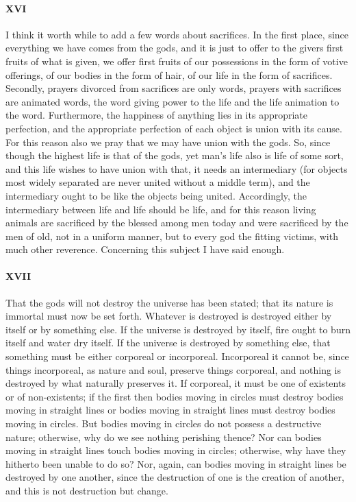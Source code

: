 \documentclass[12pt]{article}
\begin{document}
\paragraph{XVI} I think it worth while to add a few words about sacrifices.  In
the first place, since everything we have comes from the gods, and it is just
to offer to the givers first fruits of what is given, we offer first fruits of
our possessions in the form of votive offerings, of our bodies in the form of
hair, of our life in the form of sacrifices. Secondly, prayers divorced from
sacrifices are only words, prayers with sacrifices are animated words, the word
giving power to the life and the life animation to the word. Furthermore, the
happiness of anything lies in its appropriate perfection, and the appropriate
perfection of each object is union with its cause. For this reason also we pray
that we may have union with the gods. So, since though the highest life is that
of the gods, yet man's life also is life of some sort, and this life wishes to
have union with that, it needs an intermediary (for objects most widely
separated are never united without a middle term), and the intermediary ought
to be like the objects being united. Accordingly, the intermediary between life
and life should be life, and for this reason living animals are sacrificed by
the blessed among men today and were sacrificed by the men of old, not in a
uniform manner, but to every god the fitting victims, with much other
reverence. Concerning this subject I have said enough.

\paragraph{XVII} That the gods will not destroy the universe has been stated;
that its nature is immortal must now be set forth. Whatever is destroyed is
destroyed either by itself or by something else. If the universe is destroyed
by itself, fire ought to burn itself and water dry itself. If the universe is
destroyed by something else, that something must be either corporeal or
incorporeal. Incorporeal it cannot be, since things incorporeal, as nature and
soul, preserve things corporeal, and nothing is destroyed by what naturally
preserves it. If corporeal, it must be one of existents or of non-existents; if
the first then bodies moving in circles must destroy bodies moving in straight
lines or bodies moving in straight lines must destroy bodies moving in circles.
But bodies moving in circles do not possess a destructive nature; otherwise,
why do we see nothing perishing thence? Nor can bodies moving in straight lines
touch bodies moving in circles; otherwise, why have they hitherto been unable
to do so? Nor, again, can bodies moving in straight lines be destroyed by one
another, since the destruction of one is the creation of another, and this is
not destruction but change.
\end{document}
